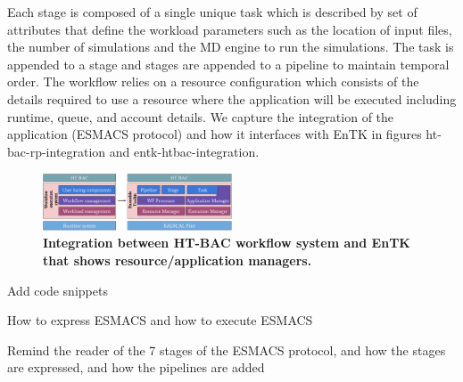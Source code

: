 
Each stage is composed of a single unique task which is described by set of attributes that define the workload parameters such as the location of input files, the number of simulations and the MD engine to run the simulations. The task is appended to a stage and stages are appended to a pipeline to maintain temporal order. The workflow relies on a resource configuration which consists of the details required to use a resource where the application will be executed including runtime, queue, and account details. We capture the integration of the application (ESMACS protocol) and how it interfaces with EnTK in figures ht-bac-rp-integration and entk-htbac-integration. 



\begin{figure}[ht]
\centering
  \includegraphics[width=0.5\textwidth]{FIGURES/entk_htbac_integration.pdf}
  \caption{\bf Integration between HT-BAC workflow system and EnTK that shows resource/application managers.}
   \label{figure:ht-bac_entk}
\end{figure}

Add code snippets 

How to express ESMACS and how to execute ESMACS


Remind the reader of the 7 stages of the ESMACS protocol, and how the stages are expressed, and how the pipelines are added 


